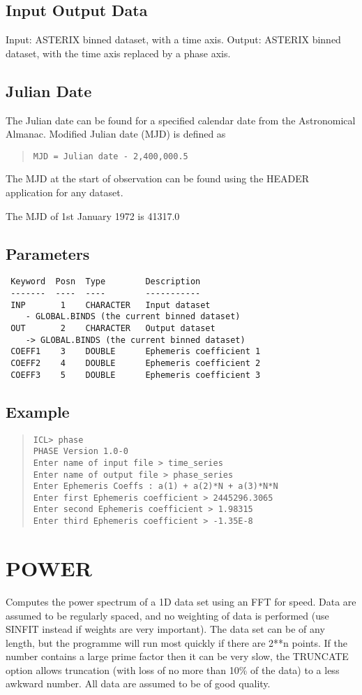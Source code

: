 \documentclass{book}
\renewcommand{\_}{{\tt\char'137}}     %
\begin{document}
\subsection{Input Output Data}
Input: ASTERIX binned dataset, with a time axis.
Output: ASTERIX binned dataset, with the time axis
replaced by a phase axis.
\subsection{Julian Date}
The Julian date can be found for a specified calendar date from the
Astronomical Almanac. Modified Julian date (MJD) is defined as
\begin{quote}\begin{verbatim}
MJD = Julian date - 2,400,000.5
\end{verbatim}\end{quote}
The MJD at the start of observation can be found using the HEADER
application for any dataset.

The MJD of 1st January 1972 is 41317.0

\subsection{Parameters}
\begin{verbatim}
 Keyword  Posn  Type        Description
 -------  ----  ----        -----------
 INP       1    CHARACTER   Input dataset
    - GLOBAL.BINDS (the current binned dataset)
 OUT       2    CHARACTER   Output dataset
    -> GLOBAL.BINDS (the current binned dataset)
 COEFF1    3    DOUBLE      Ephemeris coefficient 1
 COEFF2    4    DOUBLE      Ephemeris coefficient 2
 COEFF3    5    DOUBLE      Ephemeris coefficient 3

\end{verbatim}\subsection{Example}
\begin{quote}\begin{verbatim}
ICL> phase
PHASE Version 1.0-0
Enter name of input file > time_series
Enter name of output file > phase_series
Enter Ephemeris Coeffs : a(1) + a(2)*N + a(3)*N*N
Enter first Ephemeris coefficient > 2445296.3065
Enter second Ephemeris coefficient > 1.98315
Enter third Ephemeris coefficient > -1.35E-8
\end{verbatim}\end{quote}
\section{POWER}
Computes the power spectrum of a 1D data set using an FFT for
speed. Data are assumed to be regularly spaced, and no weighting
of data is performed (use SINFIT instead if weights are very
important). The data set can be of any length, but the programme
will run most quickly if there are 2**n points. If the number
contains a large prime factor then it can be very slow, the
TRUNCATE option allows truncation (with loss of no more than 10\%
of the data) to a less awkward number. All data are assumed to be
of good quality.
\end{document}
